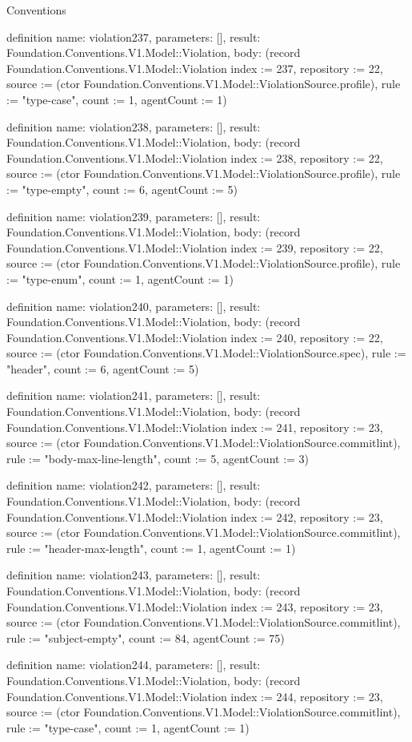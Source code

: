 \begin{lexlean}{Conventions}
\begin{semanticmodule}
definition{
  name: violation237,
  parameters: [],
  result: Foundation.Conventions.V1.Model::Violation,
  body: (record Foundation.Conventions.V1.Model::Violation {index := 237, repository := 22, source := (ctor Foundation.Conventions.V1.Model::ViolationSource.profile), rule := "type-case", count := 1, agentCount := 1})
}

definition{
  name: violation238,
  parameters: [],
  result: Foundation.Conventions.V1.Model::Violation,
  body: (record Foundation.Conventions.V1.Model::Violation {index := 238, repository := 22, source := (ctor Foundation.Conventions.V1.Model::ViolationSource.profile), rule := "type-empty", count := 6, agentCount := 5})
}

definition{
  name: violation239,
  parameters: [],
  result: Foundation.Conventions.V1.Model::Violation,
  body: (record Foundation.Conventions.V1.Model::Violation {index := 239, repository := 22, source := (ctor Foundation.Conventions.V1.Model::ViolationSource.profile), rule := "type-enum", count := 1, agentCount := 1})
}

definition{
  name: violation240,
  parameters: [],
  result: Foundation.Conventions.V1.Model::Violation,
  body: (record Foundation.Conventions.V1.Model::Violation {index := 240, repository := 22, source := (ctor Foundation.Conventions.V1.Model::ViolationSource.spec), rule := "header", count := 6, agentCount := 5})
}

definition{
  name: violation241,
  parameters: [],
  result: Foundation.Conventions.V1.Model::Violation,
  body: (record Foundation.Conventions.V1.Model::Violation {index := 241, repository := 23, source := (ctor Foundation.Conventions.V1.Model::ViolationSource.commitlint), rule := "body-max-line-length", count := 5, agentCount := 3})
}

definition{
  name: violation242,
  parameters: [],
  result: Foundation.Conventions.V1.Model::Violation,
  body: (record Foundation.Conventions.V1.Model::Violation {index := 242, repository := 23, source := (ctor Foundation.Conventions.V1.Model::ViolationSource.commitlint), rule := "header-max-length", count := 1, agentCount := 1})
}

definition{
  name: violation243,
  parameters: [],
  result: Foundation.Conventions.V1.Model::Violation,
  body: (record Foundation.Conventions.V1.Model::Violation {index := 243, repository := 23, source := (ctor Foundation.Conventions.V1.Model::ViolationSource.commitlint), rule := "subject-empty", count := 84, agentCount := 75})
}

definition{
  name: violation244,
  parameters: [],
  result: Foundation.Conventions.V1.Model::Violation,
  body: (record Foundation.Conventions.V1.Model::Violation {index := 244, repository := 23, source := (ctor Foundation.Conventions.V1.Model::ViolationSource.commitlint), rule := "type-case", count := 1, agentCount := 1})
}


\end{semanticmodule}
\end{lexlean}
